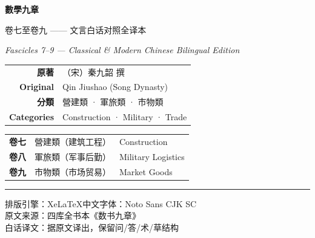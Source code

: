 \documentclass[11pt,a4paper]{article}
\providecommand{\XeLaTeX}{XeLaTeX}
\begin{document}
\begin{titlepage}
\centering
\vspace*{1.5cm}

{\fontsize{26}{34}\selectfont\color{titlecolor}
\textbf{數學九章}
}

\vspace{1cm}

{\fontsize{18}{24}\selectfont\color{sectioncolor}
卷七至卷九 —— 文言白话对照全译本
}

\vspace{0.5cm}

{\large\color{sectioncolor}
\textit{Fascicles 7--9 — Classical \& Modern Chinese Bilingual Edition}
}

\vspace{2cm}

{\large
\begin{tabular}{rl}
\textbf{原著} & （宋）秦九韶 撰 \\
\textbf{Original} & Qin Jiushao (Song Dynasty) \\
\textbf{分類} & 營建類 · 軍旅類 · 市物類 \\
\textbf{Categories} & Construction · Military · Trade \\
\end{tabular}
}

\vspace{1.5cm}


\vspace{2cm}

{\large
\begin{tabular}{lll}
\textbf{卷七} & 營建類（建筑工程）& Construction \\
\textbf{卷八} & 軍旅類（军事后勤）& Military Logistics \\
\textbf{卷九} & 市物類（市场贸易）& Market Goods \\
\end{tabular}
}

\vspace{1.5cm}

{\color{rulecolor}\rule{0.6\textwidth}{0.6pt}}

\vspace{0.5cm}

{\small\color{sectioncolor}
排版引擎：\XeLaTeX\quad 中文字体：Noto Sans CJK SC\\
原文来源：四库全书本《数书九章》\\
白话译文：据原文译出，保留问/答/术/草结构
}

\end{titlepage}
\end{document}
